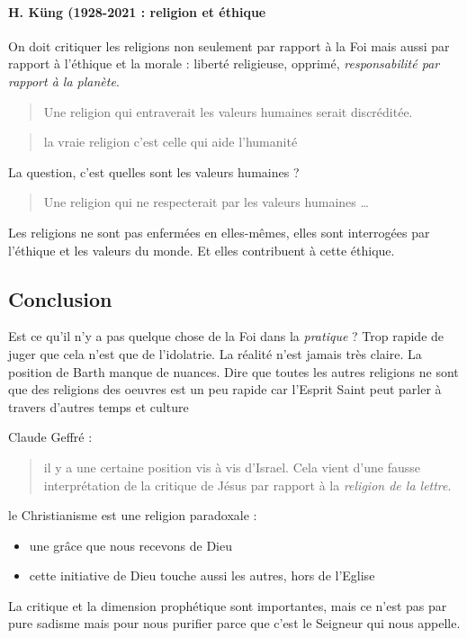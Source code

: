 \paragraph{H. Küng (1928-2021 : religion et éthique}

On doit critiquer les religions non seulement par rapport à la Foi mais aussi par rapport à l'éthique et la morale : liberté religieuse, opprimé, \textit{responsabilité par rapport à la planète}.

\begin{quote}
    Une religion qui entraverait les valeurs humaines serait discréditée.
\end{quote}

\begin{quote}
    la vraie religion c'est celle qui aide l'humanité
\end{quote}
La question, c'est quelles sont les valeurs humaines ? 
\begin{quote}
    Une religion qui ne respecterait par les valeurs humaines \ldots
\end{quote}

Les religions ne sont pas enfermées en elles-mêmes, elles sont interrogées par l'éthique et les valeurs du monde. Et elles contribuent à cette éthique.
\subsection{Conclusion}
 
 \begin{Synthesis}
 Est ce qu'il n'y a pas quelque chose de la Foi dans la \textit{pratique} ? Trop rapide de juger que cela n'est que de l'idolatrie. La réalité n'est jamais très claire. La position de Barth manque de nuances.
 Dire que toutes les autres religions ne sont que des religions des oeuvres est un peu rapide car l'Esprit Saint peut parler à travers d'autres temps et culture 
 \end{Synthesis}
 
 Claude Geffré : 
 \begin{quote}
     il y a une certaine position vis à vis d'Israel. Cela vient d'une fausse interprétation de la critique de Jésus par rapport à la \textit{religion de la lettre}. 
     
 \end{quote}
 
 le Christianisme est une religion paradoxale :
 \begin{itemize}
    \item une grâce que nous recevons de Dieu
     \item cette initiative de Dieu touche aussi les autres, hors de l'Eglise
 \end{itemize}
 La critique et la dimension prophétique sont importantes, mais ce n'est pas par pure sadisme mais pour nous purifier parce que c'est le Seigneur qui nous appelle. 